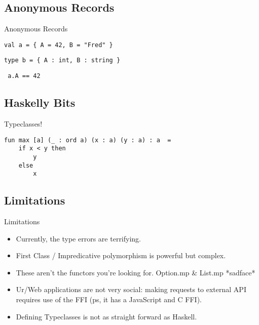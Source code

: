 \documentclass[aspectratio=169]{beamer}
\begin{document}
\subsection{Anonymous Records}
\begin{frame}[fragile]{Anonymous Records}
\begin{verbatim}
val a = { A = 42, B = "Fred" }
\end{verbatim}
\begin{verbatim}
type b = { A : int, B : string }
\end{verbatim}
\begin{verbatim} a.A == 42 \end{verbatim}
\end{frame}

\subsection{Haskelly Bits}
\begin{frame}[fragile]{Typeclasses!}
\begin{verbatim}
fun max [a] (_ : ord a) (x : a) (y : a) : a  =
    if x < y then
        y
    else
        x
\end{verbatim}
\end{frame}

\subsection{Limitations}
\begin{frame}[fragile]{Limitations}
\begin{itemize}
\item Currently, the type errors are terrifying.
\item First Class / Impredicative polymorphism is powerful but complex.
\item These aren't the functors you're looking for. Option.mp \& List.mp *sadface*
\item Ur/Web applications are not very social: making requests to external API requires use of the FFI (ps, it has a JavaScript and C FFI).
\item Defining Typeclasses is not as straight forward as Haskell.
\end{itemize}
\end{frame}
\end{document}
